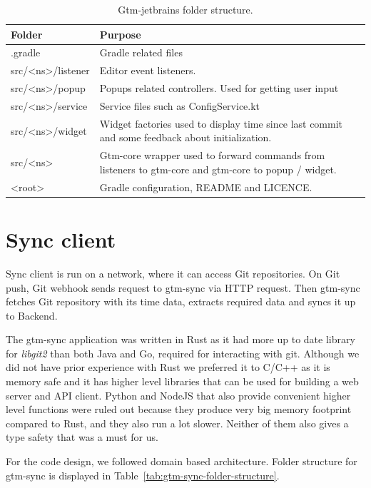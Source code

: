 \begin{table}[h]
    \centering
    \begin{tabular}{ | p{3cm} | p{10cm} |}
        \hline
        Folder & Purpose\\
        \hline
        .gradle & Gradle related files\\
        \hline
        src/<ns>/listener & Editor event listeners.\\
        \hline
        src/<ns>/popup & Popups related controllers.
        Used for getting user input\\
        \hline
        src/<ns>/service & Service files such as ConfigService.kt\\
        \hline
        src/<ns>/widget & Widget factories used to display time since last commit and some feedback about initialization.\\
        \hline
        src/<ns> & Gtm-core wrapper used to forward commands from listeners to gtm-core and gtm-core to popup / widget.\\
        \hline
        <root> & Gradle configuration, README and LICENCE.\\
        \hline
    \end{tabular}
    \caption{Gtm-jetbrains folder structure.}
    \label{tab:gtm-jetbrains-folder-structure}
\end{table}

\section{Sync client}\label{sec:sync-client}
Sync client is run on a network, where it can access Git repositories.
On Git push, Git webhook sends request to gtm-sync via HTTP request.
Then gtm-sync fetches Git repository with its time data, extracts required data and syncs it up to Backend.

The gtm-sync application was written in Rust as it had more up to date library for \textit{libgit2} than both Java and Go, required for interacting with git.
Although we did not have prior experience with Rust we preferred it to C/C++ as it is memory safe and it has higher level libraries that can be
used for building a web server and API client.
Python and NodeJS that also provide convenient higher level functions were ruled out because they produce very
big memory footprint compared to Rust, and they also run a lot slower.
Neither of them also gives a type safety that was a must for us.

For the code design, we followed domain based architecture.
Folder structure for gtm-sync is displayed in Table~\ref{tab:gtm-sync-folder-structure}.

